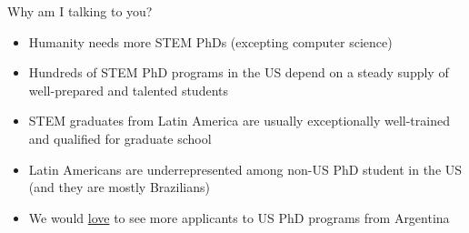 \begin{frame}[fragile]{Why am I talking to you?}

\begin{itemize}
    \item Humanity needs more STEM PhDs (excepting computer science) 
    \item Hundreds of STEM PhD programs in the US depend on a steady supply of well-prepared and talented students
    \item STEM graduates from Latin America are usually exceptionally well-trained and qualified for graduate school
    \item Latin Americans are underrepresented among non-US PhD student in the US (and they are mostly Brazilians)
    \item We would \ul{love} to see more applicants to US PhD programs from Argentina
\end{itemize}
\end{frame}

